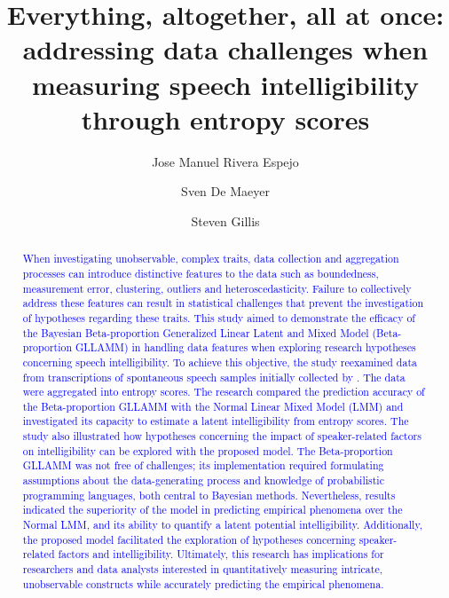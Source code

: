 \documentclass[
  authoryear,
  preprint,
  1p]{elsarticle}
\begin{document}
\begin{frontmatter}
\title{Everything, altogether, all at once: addressing data challenges
when measuring speech intelligibility through entropy scores}
\author[1]{Jose Manuel Rivera Espejo%
%
}
\author[1]{Sven De Maeyer%
%
}
\author[2]{Steven Gillis%
%
}





        
\begin{abstract}
\textcolor{blue}{When investigating unobservable, complex traits, data collection and aggregation processes can introduce distinctive features to the data such as boundedness, measurement error, clustering, outliers and heteroscedasticity. Failure to collectively address these features can result in statistical challenges that prevent the investigation of hypotheses regarding these traits.
This study aimed to demonstrate the efficacy of the Bayesian
Beta-proportion Generalized Linear Latent and Mixed Model
(Beta-proportion GLLAMM)
\citep{Rabe_et_al_2004a, Rabe_et_al_2004b, Rabe_et_al_2004c, Skrondal_et_al_2004a}
in handling data features when exploring research hypotheses
concerning speech intelligibility. To achieve this objective, the study
reexamined data from transcriptions of spontaneous speech samples
initially collected by \citet{Boonen_et_al_2023}. The data were
aggregated into entropy scores. The research compared the prediction
accuracy of the Beta-proportion GLLAMM with the Normal Linear Mixed
Model (LMM) \citep{Holmes_et_al_2019} and investigated its capacity to
estimate a latent intelligibility from entropy scores. The study also
illustrated how hypotheses concerning the impact of speaker-related
factors on intelligibility can be explored with the proposed model. The
Beta-proportion GLLAMM was not free of challenges; its implementation
required formulating assumptions about the data-generating process and
knowledge of probabilistic programming languages, both central to
Bayesian methods. Nevertheless, results indicated the superiority of the
model in predicting empirical phenomena over the Normal LMM, and its
ability to quantify a latent potential intelligibility. Additionally,
the proposed model facilitated the exploration of hypotheses concerning
speaker-related factors and intelligibility. Ultimately, this research
has implications for researchers and data analysts interested in
quantitatively measuring intricate, unobservable constructs while
accurately predicting the empirical phenomena.}
\end{abstract}






\end{frontmatter}
\end{document}
